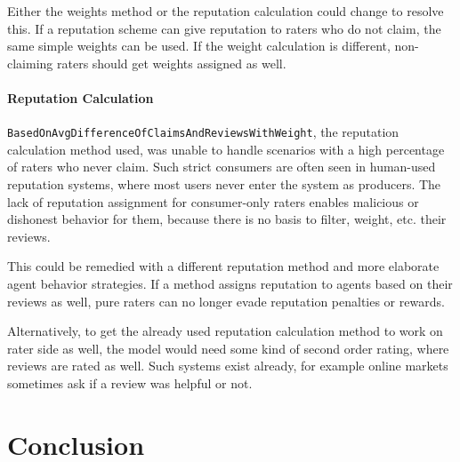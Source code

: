 \documentclass[%
    ]{\PathToTumTemplate/thesis/tum_thesis}
\begin{document}
Either the weights method or the reputation calculation could change to resolve this.
If a reputation scheme can give reputation to raters who do not claim, the same simple weights can be used.
If the weight calculation is different, non-claiming raters should get weights assigned as well.



\subsubsection{Reputation Calculation}
\lstinline{BasedOnAvgDifferenceOfClaimsAndReviewsWithWeight}, the reputation calculation method used, was unable to handle scenarios with a high percentage of raters who never claim.
Such strict consumers are often seen in human-used reputation systems, where most users never enter the system as producers.
The lack of reputation assignment for consumer-only raters enables malicious or dishonest behavior for them, because there is no basis to filter, weight, etc. their reviews.

This could be remedied with a different reputation method and more elaborate agent behavior strategies.
If a method assigns reputation to agents based on their reviews as well, pure raters can no longer evade reputation penalties or rewards.

Alternatively, to get the already used reputation calculation method to work on rater side as well, the model would need some kind of second order rating, where reviews are rated as well.
Such systems exist already, for example online markets sometimes ask if a review was helpful or not.





\chapter{Conclusion} \label{chap:conclusion}
 
\end{document}
